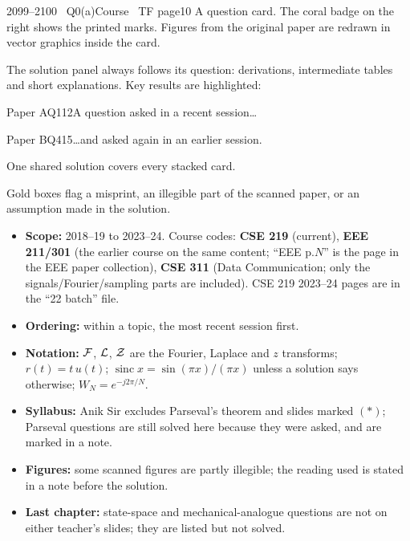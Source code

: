 \begin{qcard}{2099--2100 \textbullet\ Q0(a)}{Course \textbullet\ TF page}{10}
A question card. The coral badge on the right shows the printed marks. Figures from the original paper are redrawn in vector graphics inside the card.
\end{qcard}
\begin{solution}
The solution panel always follows its question: derivations, intermediate tables and short explanations. Key results are highlighted:
\end{solution}
\begin{qcard}{Paper A}{Q1}{12}A question asked in a recent session\ldots\end{qcard}
\begin{qcard}{Paper B}{Q4}{15}\ldots and asked again in an earlier session.\end{qcard}
\begin{solution}One shared solution covers every stacked card.\end{solution}
\begin{notebox}Gold boxes flag a misprint, an illegible part of the scanned paper, or an assumption made in the solution.\end{notebox}

\begin{itemize}[leftmargin=1.4em,itemsep=2pt]
\item \textbf{Scope:} 2018--19 to 2023--24. Course codes: \textbf{CSE 219} (current), \textbf{EEE 211/301} (the earlier course on the same content; ``EEE p.$N$'' is the page in the EEE paper collection), \textbf{CSE 311} (Data Communication; only the signals/Fourier/sampling parts are included). CSE 219 2023--24 pages are in the ``22 batch'' file.
\item \textbf{Ordering:} within a topic, the most recent session first.
\item \textbf{Notation:} $\mathcal{F}$, $\mathcal{L}$, $\mathcal{Z}$ are the Fourier, Laplace and $z$ transforms; $r(t)=t\,u(t)$; $\operatorname{sinc}x=\sin(\pi x)/(\pi x)$ unless a solution says otherwise; $W_N=e^{-j2\pi/N}$.
\item \textbf{Syllabus:} Anik Sir excludes Parseval's theorem and slides marked $(*)$; Parseval questions are still solved here because they were asked, and are marked in a note.
\item \textbf{Figures:} some scanned figures are partly illegible; the reading used is stated in a note before the solution.
\item \textbf{Last chapter:} state-space and mechanical-analogue questions are not on either teacher's slides; they are listed but not solved.
\end{itemize}
